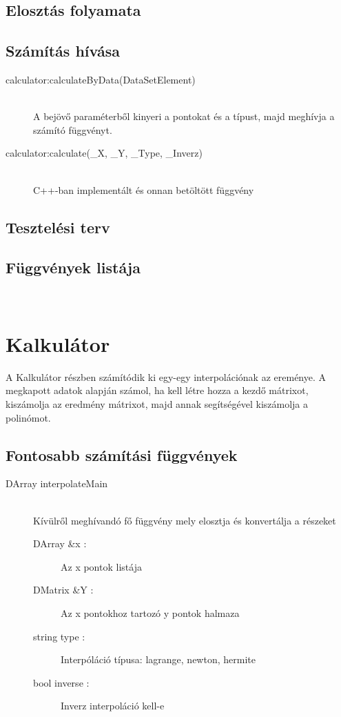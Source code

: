 \subsection{Elosztás folyamata}
\subsection{Számítás hívása}
	\begin{description}
	\item[calculator:calculateByData(DataSetElement)]
	\hfill \\ A bejövő paraméterből kinyeri a pontokat és a típust, majd meghívja a számító függvényt.
	\item[calculator:calculate(\_X, \_Y, \_Type, \_Inverz)]
	\hfill \\ C++-ban implementált és onnan betöltött függvény
	\end{description}
\subsection{Tesztelési terv}
\subsection{Függvények listája}
	\begin{description}
		\item[]
		\hfill \\ 
	\end{description}

\section{Kalkulátor}
A Kalkulátor részben számítódik ki egy-egy interpolációnak az ereménye.
A megkapott adatok alapján számol, ha kell létre hozza a kezdő mátrixot, kiszámolja az eredmény mátrixot, majd annak segítségével kiszámolja a polinómot.
\subsection{Fontosabb számítási függvények}

\begin{description}
	\item[DArray interpolateMain] 
	\hfill \\ Kívülről meghívandó fő függvény mely elosztja és konvertálja a részeket
	\begin{description}
	  \item[DArray \&x :] Az x pontok listája 
	  \item[DMatrix \&Y :] Az x pontokhoz tartozó y pontok halmaza
	  \item[string type :] Interpóláció típusa: lagrange, newton, hermite
	  \item[bool inverse :] Inverz interpoláció kell-e
	\end{description}
\end{description}
